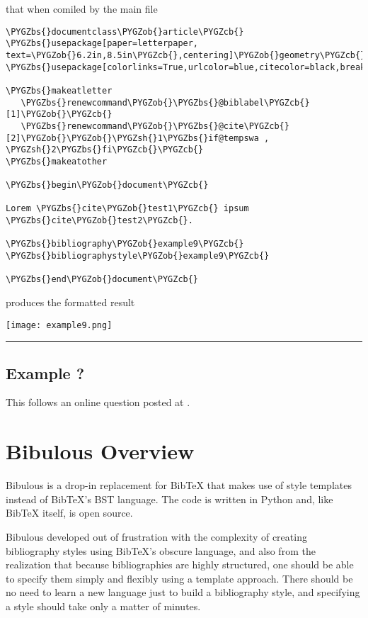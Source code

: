 \documentclass[letterpaper,10pt,english]{sphinxmanual}
\def\PYGZbs{\char`\\}
\def\PYGZob{\char`\{}
\def\PYGZcb{\char`\}}
\def\PYGZsh{\char`\#}
\begin{document}
that when comiled by the main  file

\begin{Verbatim}[commandchars=\\\{\}]
\PYGZbs{}documentclass\PYGZob{}article\PYGZcb{}
\PYGZbs{}usepackage[paper=letterpaper, text=\PYGZob{}6.2in,8.5in\PYGZcb{},centering]\PYGZob{}geometry\PYGZcb{}
\PYGZbs{}usepackage[colorlinks=True,urlcolor=blue,citecolor=black,breaklinks=true]\PYGZob{}hyperref\PYGZcb{}

\PYGZbs{}makeatletter
   \PYGZbs{}renewcommand\PYGZob{}\PYGZbs{}@biblabel\PYGZcb{}[1]\PYGZob{}\PYGZcb{}
   \PYGZbs{}renewcommand\PYGZob{}\PYGZbs{}@cite\PYGZcb{}[2]\PYGZob{}\PYGZob{}\PYGZsh{}1\PYGZbs{}if@tempswa , \PYGZsh{}2\PYGZbs{}fi\PYGZcb{}\PYGZcb{}
\PYGZbs{}makeatother

\PYGZbs{}begin\PYGZob{}document\PYGZcb{}

Lorem \PYGZbs{}cite\PYGZob{}test1\PYGZcb{} ipsum \PYGZbs{}cite\PYGZob{}test2\PYGZcb{}.

\PYGZbs{}bibliography\PYGZob{}example9\PYGZcb{}
\PYGZbs{}bibliographystyle\PYGZob{}example9\PYGZcb{}

\PYGZbs{}end\PYGZob{}document\PYGZcb{}
\end{Verbatim}

produces the formatted result

\texttt{[image: example9.png]}


\bigskip\hrule{}\bigskip



\section{Example ?}
\label{examples:example}
This follows an online question posted at .


\chapter{Bibulous Overview}
\label{index:bibulous-overview}
Bibulous is a drop-in replacement for BibTeX that makes use of style templates instead of BibTeX's BST language. The code is written in Python and, like BibTeX itself, is open source.

Bibulous developed out of frustration with the complexity of creating bibliography styles using BibTeX's obscure language, and also from the realization that because bibliographies are highly structured, one should be able to specify them simply and flexibly using a template approach. There should be no need to learn a new language just to build a bibliography style, and specifying a style should take only a matter of minutes.
\end{document}
